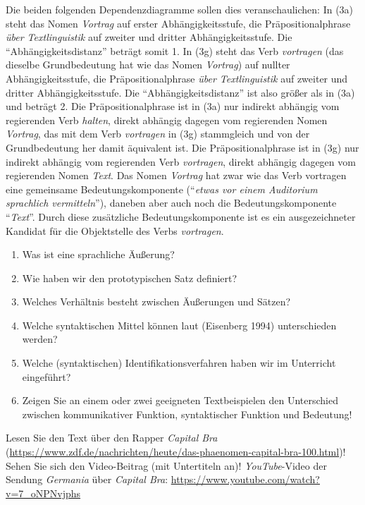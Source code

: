 \documentclass[
  letterpaper,
  DIV=11,
  numbers=noendperiod]{scrreprt}
\providecommand{\tightlist}{%
  \setlength{\itemsep}{0pt}\setlength{\parskip}{0pt}}\usepackage{longtable,booktabs,array}
\begin{document}
Die beiden folgenden Dependenzdiagramme sollen dies veranschaulichen: In
(3a) steht das Nomen \emph{Vortrag} auf erster Abhängigkeitsstufe, die
Präpositionalphrase \emph{über Textlinguistik} auf zweiter und dritter
Abhängigkeitsstufe. Die ``Abhängigkeitsdistanz'' beträgt somit 1. In
(3g) steht das Verb \emph{vortragen} (das dieselbe Grundbedeutung hat
wie das Nomen \emph{Vortrag}) auf nullter Abhängigkeitsstufe, die
Präpositionalphrase \emph{über Textlinguistik} auf zweiter und dritter
Abhängigkeitsstufe. Die ``Abhängigkeitsdistanz'' ist also größer als in
(3a) und beträgt 2. Die Präpositionalphrase ist in (3a) nur indirekt
abhängig vom regierenden Verb \emph{halten}, direkt abhängig dagegen vom
regierenden Nomen \emph{Vortrag}, das mit dem Verb \emph{vortragen} in
(3g) stammgleich und von der Grundbedeutung her damit äquivalent ist.
Die Präpositionalphrase ist in (3g) nur indirekt abhängig vom
regierenden Verb \emph{vortragen}, direkt abhängig dagegen vom
regierenden Nomen \emph{Text}. Das Nomen \emph{Vortrag} hat zwar wie das
Verb vortragen eine gemeinsame Bedeutungskomponente (``\emph{etwas vor
einem Auditorium sprachlich vermitteln}''), daneben aber auch noch die
Bedeutungskomponente ``\emph{Text}''. Durch diese zusätzliche
Bedeutungskomponente ist es ein ausgezeichneter Kandidat für die
Objektstelle des Verbs \emph{vortragen}.

\begin{enumerate}
\def\labelenumi{\arabic{enumi}.}
\tightlist
\item
  Was ist eine sprachliche Äußerung?\\
\item
  Wie haben wir den prototypischen Satz definiert?\\
\item
  Welches Verhältnis besteht zwischen Äußerungen und Sätzen?\\
\item
  Welche syntaktischen Mittel können laut (Eisenberg 1994) unterschieden
  werden?\\
\item
  Welche (syntaktischen) Identifikationsverfahren haben wir im
  Unterricht eingeführt?\\
\item
  Zeigen Sie an einem oder zwei geeigneten Textbeispielen den
  Unterschied zwischen kommunikativer Funktion, syntaktischer Funktion
  und Bedeutung!\\
\end{enumerate}

Lesen Sie den Text über den Rapper \emph{Capital Bra}
(\url{https://www.zdf.de/nachrichten/heute/das-phaenomen-capital-bra-100.html})!
Sehen Sie sich den Video-Beitrag (mit Untertiteln an)!
\emph{YouTube}-Video der Sendung \emph{Germania} über \emph{Capital
Bra}: \url{https://www.youtube.com/watch?v=7_oNPNvjphs}
\end{document}
